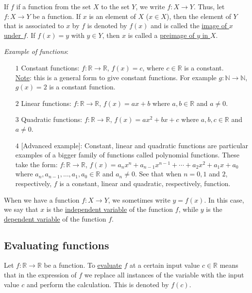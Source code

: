 \documentclass[12pt]{article}
\begin{document}
If $f$ if a function from the set $X$ to the set $Y$, we write $f:X\to Y$. Thus, let $f:X\to Y$ be a function. If $x$ is an element of $X$ ($x\in X$), then the element of $Y$ that is associated to $x$ by $f$ is denoted by $f(x)$ and is called the \underline{image of $x$ under $f$}. If $f(x)=y$ with $y\in Y$, then $x$ is called a \underline{preimage of $y$ in $X$}.

\textit{Example of functions}:
\begin{enumerate}
\item[$1$] Constant functions: $f:\mathbb{R}\to \mathbb{R}$, $f(x)=c$, where $c\in \mathbb{R}$ is a constant. \\
\underline{Note}: this is a general form to give constant functions. For example $g:\mathbb{N}\to \mathbb{N}$, $g(x)=2$ is a constant function. 
\item[$2$] Linear functions: $f:\mathbb{R}\to \mathbb{R}$,  $f(x)=ax+b$ where $a, b\in \mathbb{R}$ and $a\neq 0$. 
\item[$3$] Quadratic functions: $f:\mathbb{R}\to \mathbb{R}$,  $f(x)=ax^{2}+bx+c$ where $a, b, c\in \mathbb{R}$ and $a\neq 0$. 
\item[$4$] [Advanced example]: Constant, linear and quadratic functions are particular examples of a bigger family of functions called polynomial functions. These take the form: $f:\mathbb{R}\to \mathbb{R}$,  $f(x)=a_{n}x^{n}+a_{n-1}x^{n-1}+\cdots +a_{2}x^{2}+a_{1}x+a_{0}$ where $a_{n}, a_{n-1}, \dots, a_{1}, a_{0}\in \mathbb{R}$ and $a_{n}\neq 0$. See that when $n=0,1$ and $2$, respectively, $f$ is a constant, linear and quadratic, respectively, function.
\end{enumerate}

When we have a function  $f:X\to Y$, we sometimes write $y=f(x)$. In this case, we say that $x$ is the \underline{independent variable} of the function $f$, while $y$ is the \underline{dependent variable} of the function $f$.

\subsection{Evaluating functions}
Let $f:\mathbb{R}\to \mathbb{R}$ be a function. To \underline{evaluate} $f$ at a certain input value $c\in \mathbb{R}$ means that in the expression of $f$ we replace all instances of the variable with the input value $c$ and perform the calculation. This is denoted by $f(c)$. 
\end{document}
